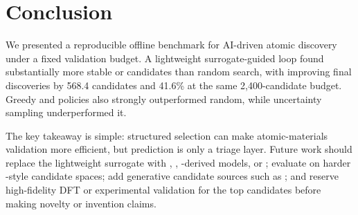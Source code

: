 \section{Conclusion}
\label{sec:conclusion}

We presented a reproducible offline benchmark for AI-driven atomic discovery under a fixed validation budget. A lightweight surrogate-guided loop found substantially more stable or \nearhull \mpdata candidates than random search, with \diverseucb improving final discoveries by 568.4 candidates and 41.6\% at the same 2,400-candidate budget. Greedy and \ucb policies also strongly outperformed random, while uncertainty sampling underperformed it.

The key takeaway is simple: structured selection can make atomic-materials validation more efficient, but prediction is only a triage layer. Future work should replace the lightweight surrogate with \chgnet, \macemp, \omat-derived models, or \uma; evaluate on harder \matbench-style candidate spaces; add generative candidate sources such as \mattergen; and reserve high-fidelity DFT or experimental validation for the top candidates before making novelty or invention claims.
